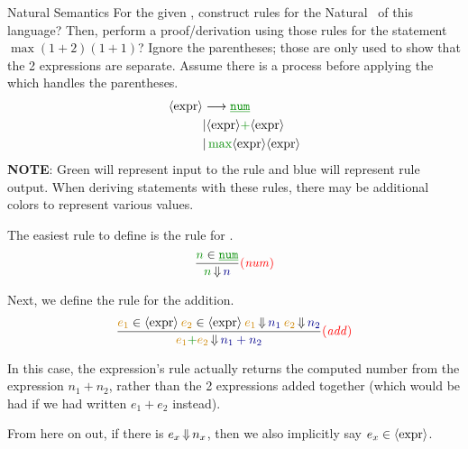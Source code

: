 \begin{example}[Lecture 3]{Natural Semantics}
  For the given , construct rules for the Natural~ of this language?
  Then, perform a proof/derivation using those rules for the statement $\max (1+2) (1+1)$?
  Ignore the parentheses; those are only used to show that the 2 expressions are separate.
  Assume there is a process before applying the  which handles the parentheses.
  \begin{align*}
    \Nonterminal{expr} &\longrightarrow \SemanticInput{\underline{\mathtt{num}}} \\
                       &\vert \Nonterminal{expr} \SemanticInput{+} \Nonterminal{expr} \\
                       &\vert \, \SemanticInput{\mathtt{\max}} \Nonterminal{expr} \Nonterminal{expr}
  \end{align*}
  \tcblower{}
  \textbf{NOTE}: Green will represent input to the rule and blue will represent rule output.
  When deriving statements with these rules, there may be additional colors to represent various values.

  The easiest rule to define is the rule for .
  \begin{equation*}
    \frac{\SemanticInput{n} \in \SemanticInput{\underline{\mathtt{num}}}}{\SemanticInput{n} \EvaluatesTo \textcolor{Blue4}{n}} \SemanticRuleName{num}
  \end{equation*}

  Next, we define the rule for the addition.
  \begin{equation*}
    \frac{\OrangeText{e_{1}} \in \Nonterminal{expr} \: \OrangeText{e_{2}} \in \Nonterminal{expr} \: \OrangeText{e_{1}} \EvaluatesTo \textcolor{Blue4}{n_{1}} \: \OrangeText{e_{2}} \EvaluatesTo \textcolor{Blue4}{n_{2}}}{\OrangeText{e_{1}} \SemanticInput{\mathtt{+}} \OrangeText{e_{2}} \EvaluatesTo \textcolor{Blue4}{n_{1} + n_{2}}} \SemanticRuleName{add}
  \end{equation*}
  \begin{remark*}
    In this case, the expression's rule actually returns the computed number from the expression $n_{1} + n_{2}$, rather than the 2 expressions added together (which would be had if we had written $e_{1} + e_{2}$ instead).
  \end{remark*}

  \begin{remark*}
    From here on out, if there is $e_{x} \operatorname{\Downarrow} n_{x}$, then we also implicitly say $e_{x} \in \langle \text{expr} \rangle$.
  \end{remark*}


\end{example}
